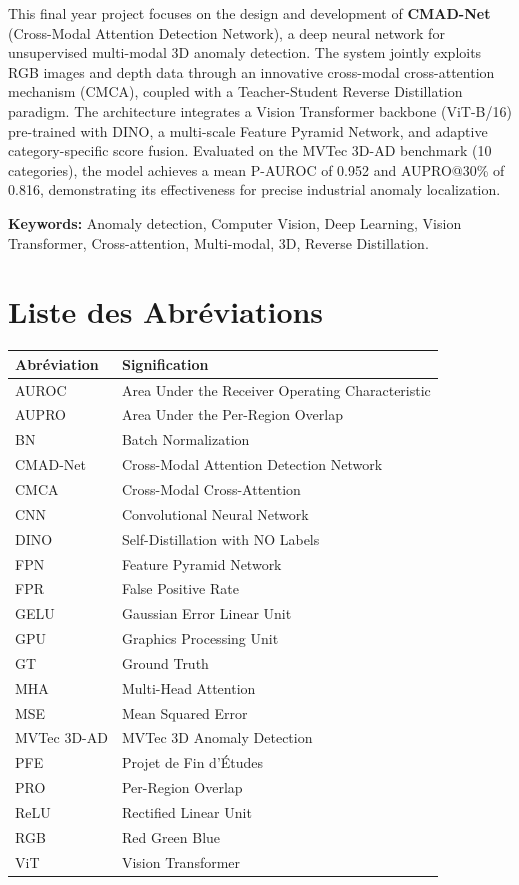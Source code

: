 \documentclass[12pt,a4paper,oneside]{report}
\begin{document}
This final year project focuses on the design and development of \textbf{CMAD-Net} (Cross-Modal Attention Detection Network), a deep neural network for unsupervised multi-modal 3D anomaly detection. The system jointly exploits RGB images and depth data through an innovative cross-modal cross-attention mechanism (CMCA), coupled with a Teacher-Student Reverse Distillation paradigm. The architecture integrates a Vision Transformer backbone (ViT-B/16) pre-trained with DINO, a multi-scale Feature Pyramid Network, and adaptive category-specific score fusion. Evaluated on the MVTec 3D-AD benchmark (10 categories), the model achieves a mean P-AUROC of 0.952 and AUPRO@30\% of 0.816, demonstrating its effectiveness for precise industrial anomaly localization.

\medskip
\noindent\textbf{Keywords:} Anomaly detection, Computer Vision, Deep Learning, Vision Transformer, Cross-attention, Multi-modal, 3D, Reverse Distillation.

\chapter*{Liste des Abréviations}

\begin{longtable}{@{}p{3.5cm}p{10cm}@{}}
\toprule
\textbf{Abréviation} & \textbf{Signification} \\
\midrule
\endhead
AUROC & Area Under the Receiver Operating Characteristic \\
AUPRO & Area Under the Per-Region Overlap \\
BN & Batch Normalization \\
CMAD-Net & Cross-Modal Attention Detection Network \\
CMCA & Cross-Modal Cross-Attention \\
CNN & Convolutional Neural Network \\
DINO & Self-Distillation with NO Labels \\
FPN & Feature Pyramid Network \\
FPR & False Positive Rate \\
GELU & Gaussian Error Linear Unit \\
GPU & Graphics Processing Unit \\
GT & Ground Truth \\
MHA & Multi-Head Attention \\
MSE & Mean Squared Error \\
MVTec 3D-AD & MVTec 3D Anomaly Detection \\
PFE & Projet de Fin d'Études \\
PRO & Per-Region Overlap \\
ReLU & Rectified Linear Unit \\
RGB & Red Green Blue \\
ViT & Vision Transformer \\
\bottomrule
\end{longtable}
\end{document}
